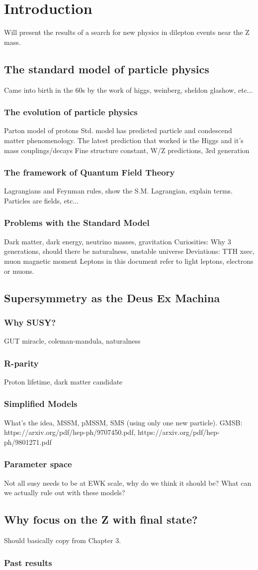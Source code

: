 \chapter{Introduction}
  Will present the results of a search for new physics in dilepton events near the Z mass.
\section{The standard model of particle physics}
  Came into birth in the 60s by the work of higgs, weinberg, sheldon glashow, etc...
  \subsection{The evolution of particle physics}
    Parton model of protons
    Std. model has predicted particle and condescend matter phenomenology. The latest prediction that worked is the Higgs and it's mass couplings/decays
    Fine structure constant, W/Z predictions, 3rd generation
  \subsection{The framework of Quantum Field Theory}
    Lagrangians and Feynman rules, show the S.M. Lagrangian, explain terms. Particles are fields, etc...
  \subsection{Problems with the Standard Model}
    Dark matter, dark energy, neutrino masses, gravitation
    Curiosities: Why 3 generations, should there be naturalness, unstable universe
    Deviations: TTH xsec, muon magnetic moment
  Leptons in this document refer to light leptons, electrons or muons.
\section{Supersymmetry as the Deus Ex Machina}
  \subsection{Why SUSY?}
    GUT miracle, coleman-mandula, naturalness
  \subsection{R-parity} \label{sec:r-parity}
    Proton lifetime, dark matter candidate
  \subsection{Simplified Models}
    What's the idea, MSSM, pMSSM, SMS (using only one new particle).
    GMSB: https://arxiv.org/pdf/hep-ph/9707450.pdf, https://arxiv.org/pdf/hep-ph/9801271.pdf
  \subsection{Parameter space}
    Not all susy needs to be at EWK scale, why do we think it should be? What can we actually rule out with these models?
\section{Why focus on the Z with \MET final state?}
  Should basically copy from Chapter 3.
  \subsection{Past results}